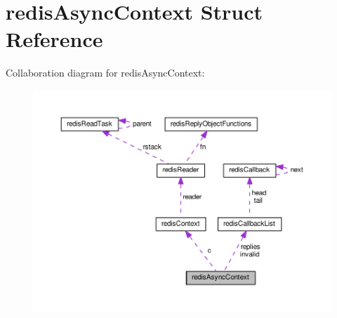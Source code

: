 \hypertarget{structredis_async_context}{\section{redis\+Async\+Context Struct Reference}
\label{structredis_async_context}
}


Collaboration diagram for redis\+Async\+Context\+:\nopagebreak
\begin{figure}[H]
\begin{center}
\leavevmode
\includegraphics[width=350pt]{structredis_async_context__coll__graph}
\end{center}
\end{figure}
